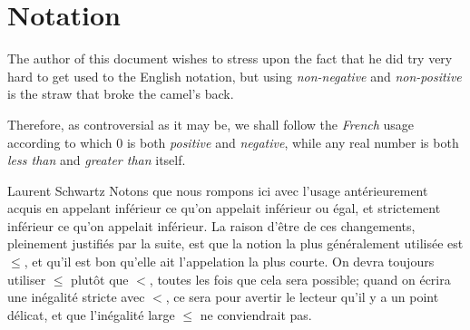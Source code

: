\chapter*{Notation}

The author of this document wishes to stress upon the fact
that he did try very hard to get used to the English notation,
but using \emph{non-negative} and \emph{non-positive}
is the straw that broke the camel's back.

Therefore,
as controversial as it may be,
we shall follow the \emph{French} usage according to which
$0$ is both \emph{positive} and \emph{negative},
while any real number is both \emph{less than} and \emph{greater than} itself.

\begin{aquote}{Laurent Schwartz}
    Notons que nous rompons ici avec l'usage ant\'erieurement acquis
    en appelant inf\'erieur ce qu'on appelait inf\'erieur ou \'egal,
    et strictement inf\'erieur ce qu'on appelait inf\'erieur.
    La raison d'\^etre de ces changements,
    pleinement justifi\'es par la suite,
    est que la notion la plus g\'en\'eralement utilis\'ee est $\leq$,
    et qu'il est bon qu'elle ait l'appelation la plus courte.
    On devra toujours utiliser $\leq$ plut\^ot que $<$,
    toutes les fois que cela sera possible;
    quand on \'ecrira une in\'egalit\'e stricte avec $<$,
    ce sera pour avertir le lecteur qu'il y a un point d\'elicat,
    et que l'in\'egalit\'e large $\leq$ ne conviendrait pas.
\end{aquote}

